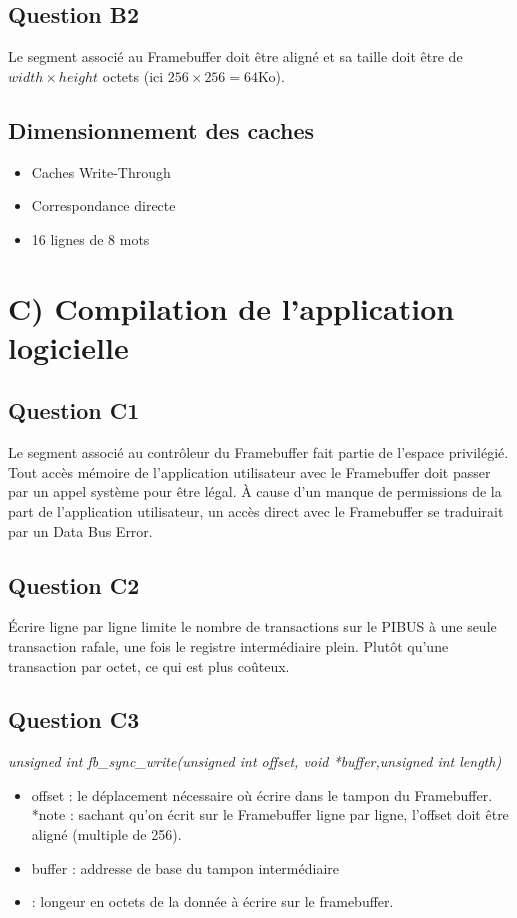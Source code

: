 \documentclass[10pt]{article}
\begin{document}
\subsection{Question B2}
Le segment associé au Framebuffer doit être aligné et sa taille doit être de
${width}\times{height}$ octets (ici ${256}\times{256}=64$Ko).

\subsection{Dimensionnement des caches}
\begin{itemize}
  \item Caches Write-Through
  \item Correspondance directe
  \item 16 lignes de 8 mots
  
\end{itemize}

\section{C) Compilation de l'application logicielle}
\subsection{Question C1}
Le segment associé au contrôleur du Framebuffer fait partie de l'espace
privilégié. Tout accès mémoire de l'application utilisateur avec le Framebuffer
doit passer par un appel système pour être légal. À cause d'un manque de
permissions de la part de l'application utilisateur, un accès direct avec le
Framebuffer se traduirait par un Data Bus Error.

\subsection{Question C2}
Écrire ligne par ligne limite le nombre de transactions sur le PIBUS à une seule
transaction rafale, une fois le registre intermédiaire plein. Plutôt qu'une
transaction par octet, ce qui est plus coûteux.

\subsection{Question C3}
{\it unsigned int fb\_sync\_write(unsigned int offset, void *buffer,unsigned int length)}\\
\begin{itemize}
  \item offset : le déplacement nécessaire où écrire dans le tampon du
  Framebuffer.\\
  *note : sachant qu'on écrit sur le Framebuffer ligne par ligne, l'offset doit
  être aligné (multiple de 256).
  \item buffer : addresse de base du tampon intermédiaire
  \item : longeur en octets de la donnée à écrire sur le framebuffer.
\end{itemize}
\end{document}
